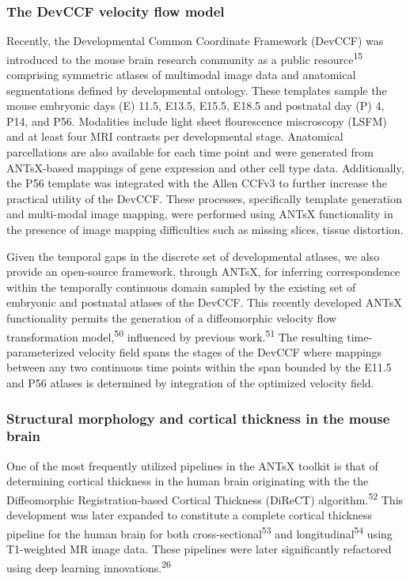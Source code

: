 \documentclass[
  12pt,
]{article}
\begin{document}
\hypertarget{the-devccf-velocity-flow-model}{%
\subsubsection{The DevCCF velocity flow
model}\label{the-devccf-velocity-flow-model}}

Recently, the Developmental Common Coordinate Framework (DevCCF) was
introduced to the mouse brain research community as a public
resource\textsuperscript{15} comprising symmetric atlases of multimodal
image data and anatomical segmentations defined by developmental
ontology. These templates sample the mouse embryonic days (E) 11.5,
E13.5, E15.5, E18.5 and postnatal day (P) 4, P14, and P56. Modalities
include light sheet flourescence miscroscopy (LSFM) and at least four
MRI contrasts per developmental stage. Anatomical parcellations are also
available for each time point and were generated from ANTsX-based
mappings of gene expression and other cell type data. Additionally, the
P56 template was integrated with the Allen CCFv3 to further increase the
practical utility of the DevCCF. These processes, specifically template
generation and multi-modal image mapping, were performed using ANTsX
functionality in the presence of image mapping difficulties such as
missing slices, tissue distortion.

Given the temporal gaps in the discrete set of developmental atlases, we
also provide an open-source framework, through ANTsX, for inferring
correspondence within the temporally continuous domain sampled by the
existing set of embryonic and postnatal atlases of the DevCCF. This
recently developed ANTsX functionality permits the generation of a
diffeomorphic velocity flow transformation model,\textsuperscript{50}
influenced by previous work.\textsuperscript{51} The resulting
time-parameterized velocity field spans the stages of the DevCCF where
mappings between any two continuous time points within the span bounded
by the E11.5 and P56 atlases is determined by integration of the
optimized velocity field.

\hypertarget{structural-morphology-and-cortical-thickness-in-the-mouse-brain}{%
\subsubsection{Structural morphology and cortical thickness in the mouse
brain}\label{structural-morphology-and-cortical-thickness-in-the-mouse-brain}}

One of the most frequently utilized pipelines in the ANTsX toolkit is
that of determining cortical thickness in the human brain originating
with the the Diffeomorphic Registration-based Cortical Thickness
(DiReCT) algorithm.\textsuperscript{52} This development was later
expanded to constitute a complete cortical thickness pipeline for the
human braiņ for both cross-sectional\textsuperscript{53} and
longitudinal\textsuperscript{54} using T1-weighted MR image data. These
pipelines were later significantly refactored using deep learning
innovations.\textsuperscript{26}
\end{document}
